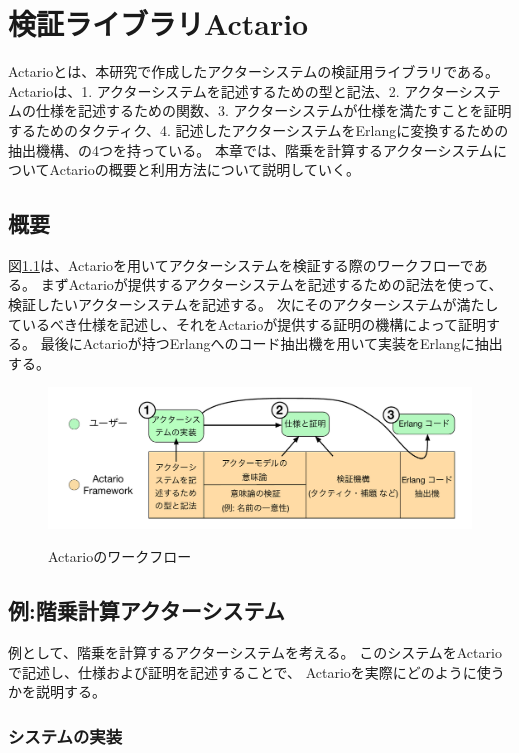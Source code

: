 \chapter{検証ライブラリActario}
\label{chapter:overview}

Actarioとは、本研究で作成したアクターシステムの検証用ライブラリである。
Actarioは、1. アクターシステムを記述するための型と記法、2. アクターシステムの仕様を記述するための関数、3. アクターシステムが仕様を満たすことを証明するためのタクティク、4. 記述したアクターシステムをErlangに変換するための抽出機構、の4つを持っている。
本章では、階乗を計算するアクターシステムについてActarioの概要と利用方法について説明していく。

\section{概要}

図\ref{img:overview:workflow}は、Actarioを用いてアクターシステムを検証する際のワークフローである。
まずActarioが提供するアクターシステムを記述するための記法を使って、検証したいアクターシステムを記述する。
次にそのアクターシステムが満たしているべき仕様を記述し、それをActarioが提供する証明の機構によって証明する。
最後にActarioが持つErlangへのコード抽出機を用いて実装をErlangに抽出する。

\begin{figure}[tp]
  \centering
  \includegraphics[width=15cm]{./img/overview/workflow.pdf}
  \label{img:overview:workflow}
  \caption{Actarioのワークフロー}
\end{figure}

\section{例:階乗計算アクターシステム}

例として、階乗を計算するアクターシステムを考える。
このシステムをActarioで記述し、仕様および証明を記述することで、
Actarioを実際にどのように使うかを説明する。

\subsection{システムの実装}

